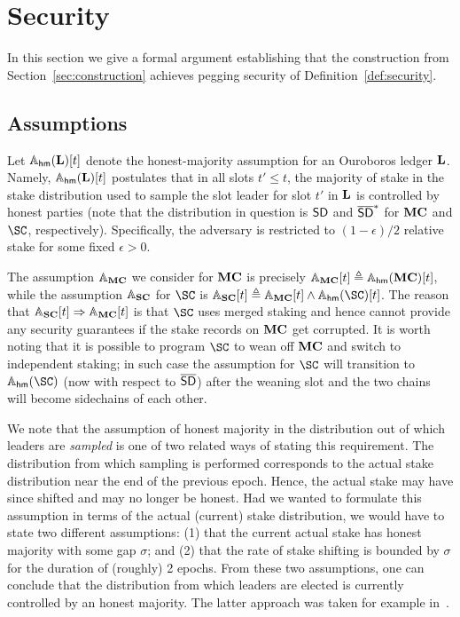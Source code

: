 \section{Security}
\label{sec:security}

In this section we give a formal argument
establishing that the
construction from Section~\ref{sec:construction} achieves
pegging security of
Definition~\ref{def:security}.

\subsection{Assumptions}

Let $\mathbb{A}_{\mathsf{hm}}(\mathbf{L})[t]$ denote the honest-majority assumption for an
Ouroboros ledger $\mathbf{L}$. Namely, $\mathbb{A}_{\mathsf{hm}}(\mathbf{L})[t]$ postulates that
in all slots $t' \leq t$, the majority of stake in the stake distribution used to
sample the slot leader for slot $t'$ in $\mathbf{L}$ is controlled by honest parties
(note that the distribution in question is $\mathsf{SD}$ and $\mathsf{\overline{SD}}^*$ for $\mathbf{MC}$ and
$\SC$, respectively).
Specifically, the adversary is restricted to $(1 - \epsilon)/{2}$ relative stake
for some fixed $\epsilon>0$.

The assumption $\mathbb{A}_{\mathbf{MC}}$ we consider for $\mathbf{MC}$
is precisely $\mathbb{A}_{\mathbf{MC}}[t]\triangleq\mathbb{A}_{\mathsf{hm}}(\mathbf{MC})[t]$, while the assumption $\mathbb{A}_{\mathbf{SC}}$ for $\SC$ is
$\Assum_\Sidechain[t]\defeq\Assum_\MC[t]\land\Assum_{\hm}(\SC)[t]$. The reason that
$\mathbb{A}_{\mathbf{SC}}[t]\Rightarrow\mathbb{A}_{\mathbf{MC}}[t]$ is that $\SC$ uses merged staking and hence
cannot provide any security guarantees if the stake records on $\mathbf{MC}$ get
corrupted. It is worth noting that it is possible to program $\SC$ to wean off
$\mathbf{MC}$ and switch to independent staking; in such case the assumption for $\SC$
will transition to $\Assum_{\hm}(\SC)$ (now with respect to $\mathsf{\overline{SD}}$) after the
weaning slot and the two chains will become sidechains of each other.

\begin{remark}
    We note that the assumption of honest majority in the distribution out of
    which leaders are \emph{sampled} is one of two related ways of stating
    this requirement. The distribution from which sampling is performed
    corresponds to the actual stake distribution near the end of the previous
    epoch. Hence, the actual stake may have since shifted and may no longer be
    honest. Had we wanted to formulate this assumption in terms of the actual
    (current) stake distribution, we would have to state two different
    assumptions: (1) that the current actual stake has honest majority with some
    gap $\sigma$; and (2) that the rate of stake shifting is bounded by $\sigma$
    for the duration of (roughly) 2 epochs.  From these two assumptions, one can
    conclude that the distribution from which leaders are elected is currently
    controlled by an honest majority.  The latter approach was taken for example
    in~\cite{C:KRDO17}.
\end{remark}

